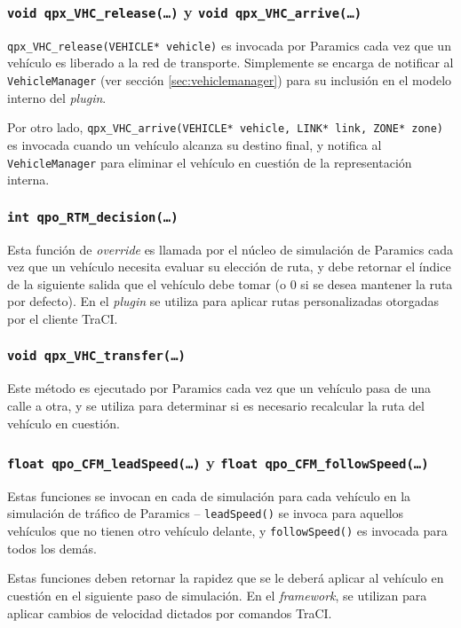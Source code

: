 \subsubsection{\texttt{void qpx\_VHC\_release(\dots)} y \texttt{void qpx\_VHC\_arrive(\dots)}}

\texttt{qpx\_VHC\_release(VEHICLE* vehicle)} es invocada por Paramics cada vez que un vehículo es liberado a la red de transporte. Simplemente se encarga de notificar al \texttt{VehicleManager} (ver sección \ref{sec:vehiclemanager}) para su inclusión en el modelo interno del \emph{plugin}.

Por otro lado, \texttt{qpx\_VHC\_arrive(VEHICLE* vehicle, LINK* link, ZONE* zone)} es invocada cuando un vehículo alcanza su destino final, y notifica al \texttt{VehicleManager} para eliminar el vehículo en cuestión de la representación interna.

\subsubsection{\texttt{int qpo\_RTM\_decision(\dots)}}\label{sec:plugin.c:decision}

Esta función de \emph{override} es llamada por el núcleo de simulación de Paramics cada vez que un vehículo necesita evaluar su elección de ruta, y debe retornar el índice de la siguiente salida que el vehículo debe tomar (o 0 si se desea mantener la ruta por defecto). En el \emph{plugin} se utiliza para aplicar rutas personalizadas otorgadas por el cliente TraCI.

\subsubsection{\texttt{void qpx\_VHC\_transfer(\dots)}}

Este método es ejecutado por Paramics cada vez que un vehículo pasa de una calle a otra, y se utiliza para determinar si es necesario recalcular la ruta del vehículo en cuestión.

\subsubsection{\texttt{float qpo\_CFM\_leadSpeed(\dots)} y \texttt{float qpo\_CFM\_followSpeed(\dots)}}\label{sec:plugin.c:speed}

Estas funciones se invocan en cada de simulación para cada vehículo en la simulación de tráfico de Paramics -- \texttt{leadSpeed()} se invoca para aquellos vehículos que no tienen otro vehículo delante, y \texttt{followSpeed()} es invocada para todos los demás.

Estas funciones deben retornar la rapidez que se le deberá aplicar al vehículo en cuestión en el siguiente paso de simulación. En el \emph{framework}, se utilizan para aplicar cambios de velocidad dictados por comandos TraCI.